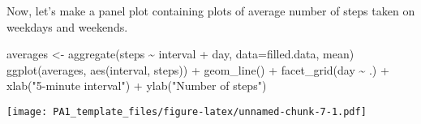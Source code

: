 \documentclass[
]{article}
\newenvironment{Shaded}{\begin{snugshade}}{\end{snugshade}}
\newcommand{\AttributeTok}[1]{\textcolor[rgb]{0.77,0.63,0.00}{#1}}
\newcommand{\FunctionTok}[1]{\textcolor[rgb]{0.00,0.00,0.00}{#1}}
\newcommand{\NormalTok}[1]{#1}
\newcommand{\OtherTok}[1]{\textcolor[rgb]{0.56,0.35,0.01}{#1}}
\newcommand{\SpecialCharTok}[1]{\textcolor[rgb]{0.00,0.00,0.00}{#1}}
\newcommand{\StringTok}[1]{\textcolor[rgb]{0.31,0.60,0.02}{#1}}
\begin{document}
Now, let's make a panel plot containing plots of average number of steps
taken on weekdays and weekends.

\begin{Shaded}
\begin{Highlighting}[]
\NormalTok{averages }\OtherTok{\textless{}{-}} \FunctionTok{aggregate}\NormalTok{(steps }\SpecialCharTok{\textasciitilde{}}\NormalTok{ interval }\SpecialCharTok{+}\NormalTok{ day, }\AttributeTok{data=}\NormalTok{filled.data, mean)}
\FunctionTok{ggplot}\NormalTok{(averages, }\FunctionTok{aes}\NormalTok{(interval, steps)) }\SpecialCharTok{+} \FunctionTok{geom\_line}\NormalTok{() }\SpecialCharTok{+} \FunctionTok{facet\_grid}\NormalTok{(day }\SpecialCharTok{\textasciitilde{}}\NormalTok{ .) }\SpecialCharTok{+}
    \FunctionTok{xlab}\NormalTok{(}\StringTok{"5{-}minute interval"}\NormalTok{) }\SpecialCharTok{+} \FunctionTok{ylab}\NormalTok{(}\StringTok{"Number of steps"}\NormalTok{)}
\end{Highlighting}
\end{Shaded}

\texttt{[image: PA1\_template\_files/figure-latex/unnamed-chunk-7-1.pdf]}
\end{document}
